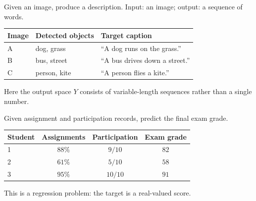 \documentclass[a4paper, 12pt]{book}
\begin{document}
\begin{example}
Given an image, produce a description. Input: an image; output: a sequence of words.
\begin{center}
\end{center}
\begin{center}
\begin{tabularx}{\textwidth}{@{}lXX@{}}
\toprule
Image & Detected objects & Target caption \\
\midrule
A & dog, grass & ``A dog runs on the grass.'' \\
B & bus, street & ``A bus drives down a street.'' \\
C & person, kite & ``A person flies a kite.'' \\
\bottomrule
\end{tabularx}
\end{center}
Here the output space $Y$ consists of variable-length sequences rather than a
single number.
\end{example}

\begin{example}
Given assignment and participation records, predict the final exam grade.
\begin{center}
\end{center}
\begin{center}
\begin{tabular}{@{}lccc@{}}
\toprule
Student & Assignments & Participation & Exam grade \\
\midrule
1 & $88\%$ & $9/10$ & $82$ \\
2 & $61\%$ & $5/10$ & $58$ \\
3 & $95\%$ & $10/10$ & $91$ \\
\bottomrule
\end{tabular}
\end{center}
This is a regression problem: the target is a real-valued score.
\end{example}
\end{document}
